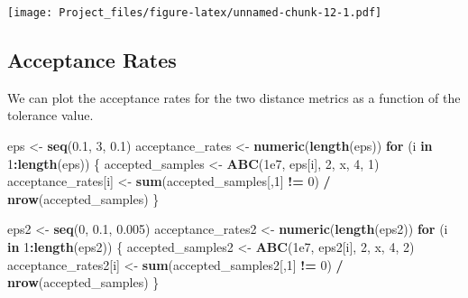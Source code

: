 \documentclass[
]{article}
\newenvironment{Shaded}{\begin{snugshade}}{\end{snugshade}}
\newcommand{\ControlFlowTok}[1]{\textcolor[rgb]{0.13,0.29,0.53}{\textbf{#1}}}
\newcommand{\DecValTok}[1]{\textcolor[rgb]{0.00,0.00,0.81}{#1}}
\newcommand{\FloatTok}[1]{\textcolor[rgb]{0.00,0.00,0.81}{#1}}
\newcommand{\FunctionTok}[1]{\textcolor[rgb]{0.13,0.29,0.53}{\textbf{#1}}}
\newcommand{\NormalTok}[1]{#1}
\newcommand{\OtherTok}[1]{\textcolor[rgb]{0.56,0.35,0.01}{#1}}
\newcommand{\SpecialCharTok}[1]{\textcolor[rgb]{0.81,0.36,0.00}{\textbf{#1}}}
\begin{document}
\texttt{[image: Project\_files/figure-latex/unnamed-chunk-12-1.pdf]}

\subsection{Acceptance Rates}\label{acceptance-rates}

We can plot the acceptance rates for the two distance metrics as a
function of the tolerance value.

\begin{Shaded}
\begin{Highlighting}[]
\NormalTok{eps }\OtherTok{\textless{}{-}} \FunctionTok{seq}\NormalTok{(}\FloatTok{0.1}\NormalTok{, }\DecValTok{3}\NormalTok{, }\FloatTok{0.1}\NormalTok{)}
\NormalTok{acceptance\_rates }\OtherTok{\textless{}{-}} \FunctionTok{numeric}\NormalTok{(}\FunctionTok{length}\NormalTok{(eps))}
\ControlFlowTok{for}\NormalTok{ (i }\ControlFlowTok{in} \DecValTok{1}\SpecialCharTok{:}\FunctionTok{length}\NormalTok{(eps)) \{}
\NormalTok{  accepted\_samples }\OtherTok{\textless{}{-}} \FunctionTok{ABC}\NormalTok{(}\FloatTok{1e7}\NormalTok{, eps[i], }\DecValTok{2}\NormalTok{, x, }\DecValTok{4}\NormalTok{, }\DecValTok{1}\NormalTok{)}
\NormalTok{  acceptance\_rates[i] }\OtherTok{\textless{}{-}} \FunctionTok{sum}\NormalTok{(accepted\_samples[,}\DecValTok{1}\NormalTok{] }\SpecialCharTok{!=} \DecValTok{0}\NormalTok{) }\SpecialCharTok{/} \FunctionTok{nrow}\NormalTok{(accepted\_samples)}
\NormalTok{\}}
\end{Highlighting}
\end{Shaded}

\begin{Shaded}
\begin{Highlighting}[]
\NormalTok{eps2 }\OtherTok{\textless{}{-}} \FunctionTok{seq}\NormalTok{(}\DecValTok{0}\NormalTok{, }\FloatTok{0.1}\NormalTok{, }\FloatTok{0.005}\NormalTok{)}
\NormalTok{acceptance\_rates2 }\OtherTok{\textless{}{-}} \FunctionTok{numeric}\NormalTok{(}\FunctionTok{length}\NormalTok{(eps2))}
\ControlFlowTok{for}\NormalTok{ (i }\ControlFlowTok{in} \DecValTok{1}\SpecialCharTok{:}\FunctionTok{length}\NormalTok{(eps2)) \{}
\NormalTok{  accepted\_samples2 }\OtherTok{\textless{}{-}} \FunctionTok{ABC}\NormalTok{(}\FloatTok{1e7}\NormalTok{, eps2[i], }\DecValTok{2}\NormalTok{, x, }\DecValTok{4}\NormalTok{, }\DecValTok{2}\NormalTok{)}
\NormalTok{    acceptance\_rates2[i] }\OtherTok{\textless{}{-}} \FunctionTok{sum}\NormalTok{(accepted\_samples2[,}\DecValTok{1}\NormalTok{] }\SpecialCharTok{!=} \DecValTok{0}\NormalTok{) }\SpecialCharTok{/} \FunctionTok{nrow}\NormalTok{(accepted\_samples)}
\NormalTok{\}}
\end{Highlighting}
\end{Shaded}
\end{document}
